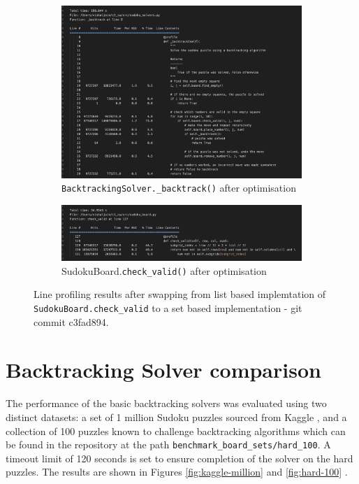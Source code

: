 \documentclass[11pt]{article}
\begin{document}
\begin{figure}[H]
    \centering
    \begin{subfigure}[b]{0.8\textwidth}
        \includegraphics[width=\textwidth]{figs/bt_line_profile_after.png}
        \caption{\texttt{BacktrackingSolver.\_backtrack()} after optimisation}
        \label{fig:backtrack_after}
    \end{subfigure}
    \begin{subfigure}[b]{0.8\textwidth}
        \includegraphics[width=\textwidth]{figs/check_valid_after.png}
        \caption{SudokuBoard.\texttt{check\_valid()} after optimisation}
        \label{fig:check_valid_after}
    \end{subfigure}
    \caption{Line profiling results after swapping from list based implemtation of \texttt{SudokuBoard.check\_valid} to a set based implementation - git commit c3fad894.}
    \label{fig:line_profiling_after}
\end{figure}

\section{Backtracking Solver comparison}
The performance of the basic backtracking solvers was evaluated using two distinct datasets: a set of 1 million Sudoku puzzles sourced from Kaggle \cite{kaggleDataset}, and a collection of 100 puzzles known to challenge backtracking algorithms which can be found in the repository at the path \texttt{benchmark\_board\_sets/hard\_100}. A timeout limit of 120 seconds is set to ensure completion of the solver on the hard puzzles. The results are shown in Figures \ref{fig:kaggle-million} and \ref{fig:hard-100} .
\end{document}
